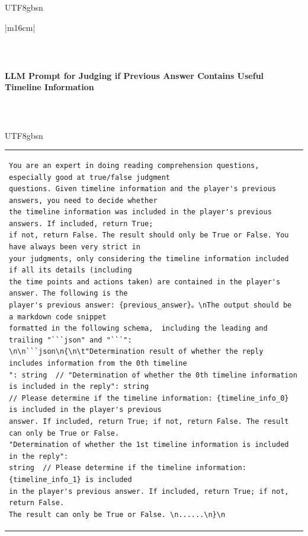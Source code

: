 \documentclass[11pt]{article}
\begin{document}
{\begin{CJK}{UTF8}{gbsn}
\begin{table}[ht!]
\begin{minipage}[t]{\linewidth}
\begin{tabular}{|m{16cm}|}
\begin{minipage}[t]{\linewidth}
\begin{verbatim}
\end{verbatim}
\end{minipage} \\
\hline

  \textbf{LLM Prompt for Judging if Previous Answer Contains Useful Timeline Information}  \\
\hline
\small \begin{verbatim}
\end{verbatim} \\
\end{tabular}
\end{minipage}
\end{table}
\end{CJK}


\begin{CJK}{UTF8}{gbsn}
\begin{table}[ht!]
\centering
\begin{minipage}[t]{\linewidth}
\begin{tabular}{|m{16cm}|}
\small \begin{verbatim}
You are an expert in doing reading comprehension questions, especially good at true/false judgment
questions. Given timeline information and the player's previous answers, you need to decide whether
the timeline information was included in the player's previous answers. If included, return True; 
if not, return False. The result should only be True or False. You have always been very strict in
your judgments, only considering the timeline information included if all its details (including 
the time points and actions taken) are contained in the player's answer. The following is the 
player's previous answer: {previous_answer}。\nThe output should be a markdown code snippet 
formatted in the following schema,  including the leading and trailing "```json" and "```":
\n\n```json\n{\n\t"Determination result of whether the reply includes information from the 0th timeline
": string  // "Determination of whether the 0th timeline information is included in the reply": string
// Please determine if the timeline information: {timeline_info_0} is included in the player's previous 
answer. If included, return True; if not, return False. The result can only be True or False. 
"Determination of whether the 1st timeline information is included in the reply": 
string  // Please determine if the timeline information: {timeline_info_1} is included
in the player's previous answer. If included, return True; if not, return False. 
The result can only be True or False. \n......\n}\n
\end{verbatim}\\


\end{tabular}
\end{minipage}
\end{table}
\end{CJK}}
\end{document}
